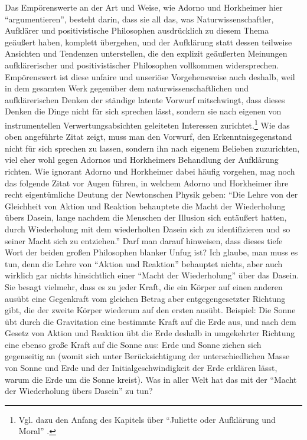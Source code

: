 \documentclass[12pt,a4paper,ngerman]{article}
\begin{document}
\label{Kritik_naturwissenschaftlichen_Denkens}
Das Empörenswerte an der Art und Weise, wie Adorno und Horkheimer hier
"`argumentieren"', besteht darin, dass sie all das, was
Naturwissenschaftler, Aufklärer und positivistische Philosophen
ausdrücklich zu diesem Thema geäußert haben, komplett übergehen, und
der Aufklärung statt dessen teilweise Ansichten und Tendenzen
unterstellen, die den explizit geäußerten Meinungen aufklärerischer
und positivistischer Philosophen vollkommen widersprechen.
Empörenswert ist diese unfaire und unseriöse Vorgehensweise auch
deshalb, weil in dem gesamten Werk gegenüber dem
naturwissenschaftlichen und aufklärerischen Denken der ständige
latente Vorwurf mitschwingt, dass dieses Denken die Dinge nicht für
sich sprechen lässt, sondern sie nach eigenen von instrumentellen
Verwertungsabsichten geleiteten Interessen zurichtet.\footnote{Vgl.
  dazu den Anfang des Kapitels über "`Juliette oder Aufklärung und
  Moral"' \cite[S. 90/91]{adorno-horkheimer:1947}.}  Wie das oben
angeführte Zitat zeigt, muss man den Vorwurf, den Erkenntnisgegenstand
nicht für sich sprechen zu lassen, sondern ihn nach eigenem Belieben
zuzurichten, viel eher wohl gegen Adornos und Horkheimers Behandlung
der Aufklärung richten. Wie ignorant Adorno und Horkheimer dabei
häufig vorgehen, mag noch das folgende Zitat vor Augen führen, in
welchem Adorno und Horkheimer ihre recht eigentümliche Deutung der
Newtonschen Physik geben: "`Die Lehre von der Gleichheit von Aktion
und Reaktion behauptete die Macht der Wiederholung übers Dasein, lange
nachdem die Menschen der Illusion sich entäußert hatten, durch
Wiederholung mit dem wiederholten Dasein sich zu identifizieren und so
seiner Macht sich zu entziehen."' \cite[S. 18]{adorno-horkheimer:1947}
Darf man darauf hinweisen, dass dieses tiefe Wort der beiden großen
Philosophen blanker Unfug ist?  Ich glaube, man muss es tun, denn die
Lehre von "`Aktion und Reaktion"' behauptet nichts, aber auch wirklich
gar nichts hinsichtlich einer "`Macht der Wiederholung"' über das
Dasein. Sie besagt vielmehr, dass es zu jeder Kraft, die ein Körper
auf einen anderen ausübt eine Gegenkraft vom gleichen Betrag aber
entgegengesetzter Richtung gibt, die der zweite Körper wiederum auf
den ersten ausübt. Beispiel: Die Sonne übt durch die Gravitation eine
bestimmte Kraft auf die Erde aus, und nach dem Gesetz von Aktion und
Reaktion übt die Erde deshalb in umgekehrter Richtung eine ebenso
große Kraft auf die Sonne aus: Erde und Sonne ziehen sich gegenseitig
an (womit sich unter Berücksichtigung der unterschiedlichen Masse von
Sonne und Erde und der Initialgeschwindigkeit der Erde erklären lässt,
warum die Erde um die Sonne kreist). Was in aller Welt hat das mit der
"`Macht der Wiederholung übers Dasein"' zu tun?
\end{document}
